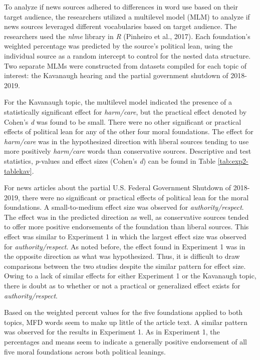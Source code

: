 \documentclass[english,,man]{apa6}
\begin{document}
To analyze if news sources adhered to differences in word use based on
their target audience, the researchers utilized a multilevel model (MLM)
to analyze if news sources leveraged different vocabularies based on
target audience. The researchers used the \emph{nlme} library in
\emph{R} (Pinheiro et al., 2017). Each foundation's weighted percentage
was predicted by the source's political lean, using the individual
source as a random intercept to control for the nested data structure.
Two separate MLMs were constructed from datasets compiled for each topic
of interest: the Kavanaugh hearing and the partial government shutdown
of 2018-2019.

For the Kavanaugh topic, the multilevel model indicated the presence of
a statistically significant effect for \emph{harm/care}, but the
practical effect denoted by Cohen's \emph{d} was found to be small.
There were no other significant or practical effects of political lean
for any of the other four moral foundations. The effect for
\emph{harm/care} was in the hypothesized direction with liberal sources
tending to use more positively \emph{harm/care} words than conservative
sources. Descriptive and test statistics, \emph{p}-values and effect
sizes (Cohen's \emph{d}) can be found in Table \ref{tab:exp2-tablekav}.

For news articles about the partial U.S. Federal Government Shutdown of
2018-2019, there were no significant or practical effects of political
lean for the moral foundations. A small-to-medium effect size was
observed for \emph{authority/respect}. The effect was in the predicted
direction as well, as conservative sources tended to offer more positive
endorsements of the foundation than liberal sources. This effect was
similar to Experiment 1 in which the largest effect size was observed
for \emph{authority/respect}. As noted before, the effect found in
Experiment 1 was in the opposite direction as what was hypothesized.
Thus, it is difficult to draw comparisons between the two studies
despite the similar pattern for effect size. Owing to a lack of similar
effects for either Experiment 1 or the Kavanaugh topic, there is doubt
as to whether or not a practical or generalized effect exists for
\emph{authority/respect}.

Based on the weighted percent values for the five foundations applied to
both topics, MFD words seem to make up little of the article text. A
similar pattern was observed for the results in Experiment 1. As in
Experiment 1, the percentages and means seem to indicate a generally
positive endorsement of all five moral foundations across both political
leanings.
\end{document}
